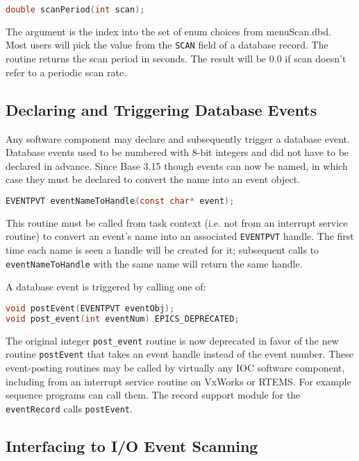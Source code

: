 \begin{lstlisting}[language=C]
double scanPeriod(int scan);
\end{lstlisting}

The argument is the index into the set of enum choices from menuScan.dbd.
Most users will pick the value from the \verb|SCAN| field of a database record.
The routine returns the scan period in seconds.
The result will be 0.0 if scan doesn't refer to a periodic scan rate.

\subsection{Declaring and Triggering Database Events}

Any software component may declare and subsequently trigger a database event.
Database events used to be numbered with 8-bit integers and did not have to be declared in advance.
Since Base 3.15 though events can now be named, in which case they must be declared to convert the name into an event object.

\begin{lstlisting}[language=C]
EVENTPVT eventNameToHandle(const char* event);
\end{lstlisting}

This routine must be called from task context (i.e. not from an interrupt service routine) to convert an event's name into an associated \verb|EVENTPVT| handle.
The first time each name is seen a handle will be created for it; subsequent calls to \verb|eventNameToHandle| with the same name will return the same handle.

A database event is triggered by calling one of:

\begin{lstlisting}[language=C]
void postEvent(EVENTPVT eventObj);
void post_event(int eventNum) EPICS_DEPRECATED;
\end{lstlisting}

The original integer \verb|post_event| routine is now deprecated in favor of the new routine \verb|postEvent| that takes an event handle instead of the event number.
These event-posting routines may be called by virtually any IOC software component, including from an interrupt service routine on VxWorks or RTEMS.
For example sequence programs can call them.
The record support module for the \verb|eventRecord| calls \verb|postEvent|.

\subsection{Interfacing to I/O Event Scanning}

